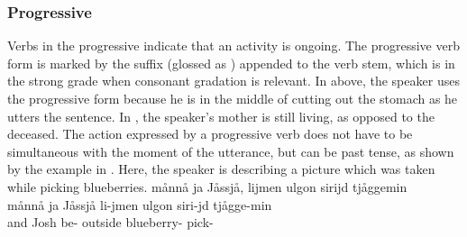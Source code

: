 \subsubsection{Progressive}\label{progressiveAspect}
Verbs in the progressive indicate that an activity is ongoing. The progressive verb form is marked by the suffix  (glossed as \PROGs) appended to the verb stem, which is in the strong grade when consonant gradation is relevant. %
In  above, the speaker uses the progressive form  because he is in the middle of cutting out the stomach as he utters the sentence. In , the speaker’s mother is still living, as opposed to the deceased. 
The action expressed by a progressive verb does not have to be simultaneous with the moment of the utterance, but can be past tense, as shown by the %
example in . %
Here, the speaker is describing a picture which was taken while picking blueberries. 
\ea\label{inflectionalCatsVerbsEx2b}%
\glll	månnå ja Jåssjå, lijmen ulgon sirijd tjåggemin\\
	månnå ja Jåssjå li-jmen ulgon siri-jd tjågge-min\\
	 and Josh\BS{} be- outside blueberry- pick-\\\nopagebreak
{}	
\z

